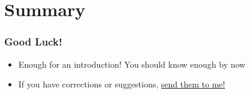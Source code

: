 \documentclass{beamer}
\newcommand{\hrefcol}[2]{\textcolor{cyan}{\href{#1}{#2}}}
\begin{document}
\section{Summary}

\begin{frame}
\frametitle{Good Luck!}
\begin{itemize}
\item Enough for an introduction! You should know enough by now
\item If you have corrections or suggestions,
\hrefcol{mailto:andrea@gasparini.cloud}{send them to me!}
\end{itemize}
\end{frame}

\backmatter
\end{document}
